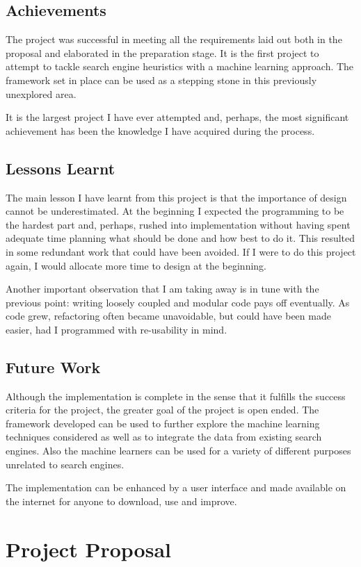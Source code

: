 \documentclass[12pt,notitlepage,twoside]{scrbook}
\begin{document}
\section{Achievements}
The project was successful in meeting all the requirements laid out both in the proposal
and elaborated in the preparation stage. It is the first project to attempt to tackle search
engine heuristics with a machine learning approach. The framework set in place 
can be used as a stepping stone in this previously unexplored area.

It is the largest project I have ever attempted and, perhaps, the most significant
achievement has been the knowledge I have acquired during the process.

\section{Lessons Learnt}
The main lesson I have learnt from this project is that the importance of design cannot be
underestimated. At the beginning I expected the programming to be the hardest part and,
perhaps, rushed into implementation without having spent adequate time planning what
should be done and how best to do it. This resulted in some redundant work that
could have been avoided. If I were to do this project again, I would allocate more time to
design at the beginning.

Another important observation that I am taking away is in tune with the previous point:
writing loosely coupled and modular code pays off eventually. As code grew, refactoring
often became unavoidable, but could have been made easier, had I programmed with
re-usability in mind.

\section{Future Work}
Although the implementation is complete in the sense that it fulfills the success criteria
for the project, the greater goal of the project is open ended. The framework developed can be
used to further explore the machine learning techniques considered as well as to integrate
the data from existing search engines. Also the machine learners can be used for a
variety of different purposes unrelated to search engines.

The implementation can be enhanced by a user interface and made available on the internet
for anyone to download, use and improve.





\appendix

\chapter{Project Proposal}
\label{prop}


\end{document}
